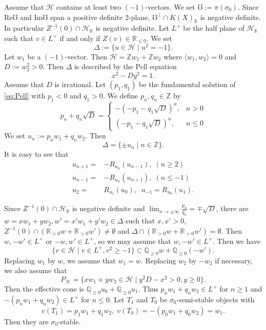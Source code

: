 \documentclass[leqno,11pt]{amsart}
\def\Q{\ensuremath{\mathbb{Q}}}
\def\R{\ensuremath{\mathbb{R}}}
\def\Z{\ensuremath{\mathbb{Z}}}
\theoremstyle{definition}
\def\Q{\ensuremath{\mathbb{Q}}}
\def\R{\ensuremath{\mathbb{R}}}
\def\Z{\ensuremath{\mathbb{Z}}}
\def\HH{\ensuremath{\mathcal H}}
\begin{document}
Assume that $\HH$ contains at least two $(-1)$-vectors.
We set $\mho:=\pi(\sigma_0)$. Since
$\mathrm{Re}\mho$ and $\mathrm{Im}\mho$ span
a positive definite 2-plane,
$\mho^\perp \cap K(X)_\R$ is negative definite.
In particular $Z^{-1}(0) \cap \HH_\R$ is negative definite.
Let $L^+$ be the half plane of $\HH_\R$ such  that
$v \in L^+$ if and only if $Z(v) \in \R_{\leq 0}$.  
We set
\begin{equation}
\Delta:=\{u \in \HH \mid u^2=-1 \}.
\end{equation}
Let $w_1$ be a $(-1)$-vector. Then $\HH=\Z w_1+\Z w_2$
where $\langle w_1,w_2 \rangle=0$ and $D:=w_2^2>0$.
Then $\Delta$ is described by 
the Pell equation
\begin{equation}\label{eq:Pell}
x^2-Dy^2=1.
\end{equation}
Assume that $D$ is irrational. 
Let $(p_1,q_1)$ be the fundamental solution of 
\eqref{eq:Pell} with $p_1<0$ and $q_1>0$.
We define $p_n, q_n \in\Z$ by
\begin{equation}
p_n+q_n \sqrt{D}=
\begin{cases}
-(-p_1-q_1 \sqrt{D})^n, & n > 0\\
(-p_1-q_1 \sqrt{D})^n, & n \leq 0
\end{cases}
\end{equation}
We set $u_n:=p_n w_1+q_n w_2$.
Then 
$$
\Delta=\{\pm u_n \mid n \in \Z\}.
$$ 
It is easy to see that
\begin{equation}
\begin{split}
u_{n+1}=&-R_{u_n}(u_{n-1}),\; (n \geq 2)\\
u_{n-1}=&-R_{u_n}(u_{n+1}),\; (n \leq -1)\\
u_2=&R_{u_1}(u_0),\;\; u_{-1}=R_{u_0}(u_1).
\end{split}
\end{equation}


Since $Z^{-1}(0) \cap \HH_\R$ is negative definite
and 
$\lim_{n \to \pm \infty}\frac{p_n}{q_n}=\mp \sqrt{D}$,
there are $w=xw_1+y w_2, w'=x' w_1+y' w_2 \in \Delta$ such that
$x,x'>0$, $Z^{-1}(0) \cap (\R_{>0}w+\R_{>0}w') \ne \emptyset$
and $\Delta \cap (\R_{>0}w+\R_{>0}w')= \emptyset$.
Then $w,-w' \in L^+$ or $-w,w' \in L^+$, so we may assume that
$w,-w' \in L^+$.
Then we have 
$$
\{ v \in \HH \mid v \in L^+, v^2 \geq -1\} \subset 
\Q_{\geq 0}w+\Q_{\geq 0}(-w').
$$
Replacing $w_1$ by $w$, we assume that $w_1=w$.
Replacing $w_2$ by $-w_2$ if necessary,
we also assume that 
$$
P_{\HH}=\{xw_1+yw_2 \in \HH \mid y^2 D-x^2>0, y \geq 0 \}.
$$
Then the effective cone is $\Q_{\geq 0}u_0+\Q_{\geq 0}u_1$.
Thus 
$p_n w_1+q_n w_2 \in L^+$ for $n \geq 1$ and
$-(p_n w_1+q_n w_2) \in L^+$ for $n \leq 0$.
Let $T_1$ and $T_0$ be $\sigma_0$-semi-stable objects
with 
$$
v(T_1)=p_1 w_1+q_1 w_2,\; 
v(T_0)=-(p_0 w_1+q_0 w_2)=w_1.
$$ 
Then they are $\sigma_0$-stable.
\end{document}

